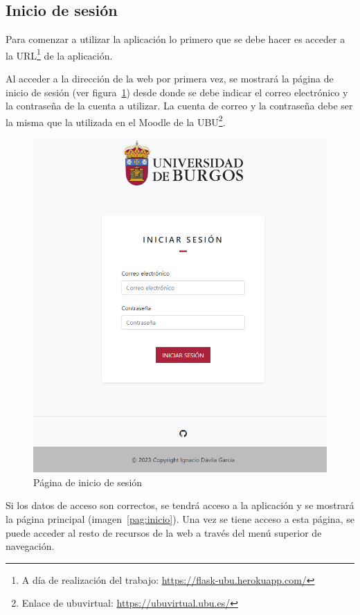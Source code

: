 \subsection{Inicio de sesión}

Para comenzar a utilizar la aplicación lo primero que se debe hacer es acceder a la URL\footnote{A día de realización del trabajo: \url{https://flask-ubu.herokuapp.com/}} de la aplicación.

Al acceder a la dirección de la web por primera vez, se mostrará la página de inicio de sesión (ver figura~\ref{pag:login}) desde donde se debe indicar el correo electrónico y la contraseña de la cuenta a utilizar.
La cuenta de correo y la contraseña debe ser la misma que la utilizada en el Moodle de la UBU\footnote{Enlace de ubuvirtual: \url{https://ubuvirtual.ubu.es/}}.

\begin{figure}
	\centering
	\includegraphics[width=\textwidth]{../img/Anexos/Manual usuario/login.png}
	\caption{Página de inicio de sesión}\label{pag:login}
\end{figure}

Si los datos de acceso son correctos, se tendrá acceso a la aplicación y se mostrará la página principal (imagen~\ref{pag:inicio}).
Una vez se tiene acceso a esta página, se puede acceder al resto de recursos de la web a través del menú superior de navegación.


